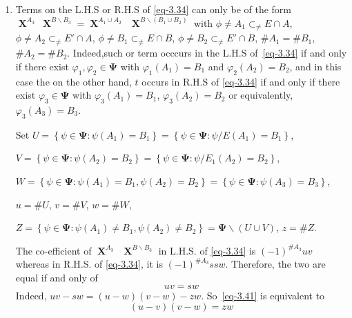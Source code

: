 \documentclass[a4paper,12pt]{article}
\DeclareMathOperator{\x}{\mathrm{X}}
\theoremstyle{definition}
\theoremstyle{underlinethm}
\theoremstyle{definition}
\begin{document}
\begin{enumerate}[label=(\alph*)]

\item Terms on the L.H.S or R.H.S of \eqref{eq-3.34} can only be of the form $\boldsymbol{\x}^{A_{3}}~\boldsymbol{\x}^{B \smallsetminus B_{3}} = \boldsymbol{\x}^{A_{1} \cup A_{2}}~~\boldsymbol{\x}^{B\smallsetminus (B_{1} \cup B_{2})}$ with $\phi \neq A_{1} \subset_{\neq} E \cap A$, $\phi \neq A_{2} \subset_{\neq} E' \cap A$, $\phi \neq B_{1} \subset_{\neq} E \cap B$, $\phi \neq B_{2} \subset_{\neq} E' \cap B$, $\# A_{1} = \# B_{1}$, $\# A_{2} = \# B_{2}$. Indeed,such or term occcurs in the L.H.S of~\eqref{eq-3.34} if and only if there exist $\varphi_{1}, \varphi_{2} \in \boldsymbol{\Psi}$ with $\varphi_{1}(A_{1})= B_{1}$ and $\varphi_{2}(A_{2}) = B_{2}$, and in this case the on the other hand, $t$ occurs in R.H.S of \eqref{eq-3.34} if and only if there exist $\varphi_{3} \in \boldsymbol{\Psi}$ with $\varphi_{3}(A_{1}) = B_{1}$, $\varphi_{3}(A_{2}) = B_{2}$ or equivalently, $\varphi_{3}(A_{3}) = B_{3}$.

Set $U = \left\{\psi \in \boldsymbol{\Psi} : \psi(A_{1}) = B_{1}\right\} = \left\{\psi \in \boldsymbol{\Psi} : \psi /E (A_{1}) = B_{1}\right\}$,

 $V= \left\{\psi \in \boldsymbol{\Psi} : \psi(A_{2}) = B_{2}\right\} = \left\{\psi \in \boldsymbol{\Psi} : \psi/E_{1} (A_{2}) =B_{2} \right\}$, 
 
 $W = \left\{\psi \in \boldsymbol{\Psi} : \psi(A_{1}) =B_{1}, \psi(A_{2}) = B_{2}\right\} = \left\{\psi \in \boldsymbol{\Psi} : \psi (A_{3}) = B_{3}\right\}$, 
 
 $u = \# U$, $v=\# V$, $w=\# W$,
 
  $Z= \left\{\psi \in \boldsymbol{\Psi} : \psi (A_{1}) \neq B_{1}, \psi(A_{2}) \neq B_{2}\right\} = \boldsymbol{\Psi} \smallsetminus (U \cup V)$, $z=\# Z$.
  
  The co-efficient of $\boldsymbol{\x}^{A_{3}}~~ \boldsymbol{\x}^{B\smallsetminus B_{3}}$ in L.H.S. of \eqref{eq-3.34} is $(-1)^{\# A_{3}} uv$ whereas in R.H.S. of \eqref{eq-3.34}, it is $(-1)^{\# A_{3}}s sw$. Therefore, the two are equal if and only of 
  \begin{equation}
  uv = sw\tag{3.41}\label{eq-3.41}
  \end{equation}
  Indeed, $uv-sw =(u-w)(v-w)-zw$. So~\eqref{eq-3.41} is equivalent to
  \begin{equation}
  (u-v)(v-w)= zw\tag{3.42}\label{eq-3.42}
  \end{equation}
  

\end{enumerate}
\end{document}
